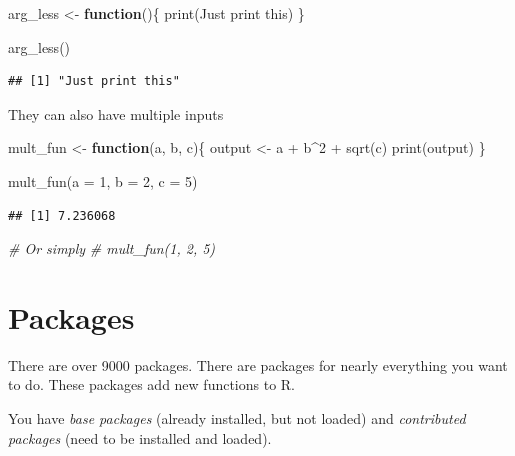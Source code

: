 \documentclass[
]{book}
\newenvironment{Shaded}{\begin{snugshade}}{\end{snugshade}}
\newcommand{\AttributeTok}[1]{\textcolor[rgb]{0.77,0.63,0.00}{#1}}
\newcommand{\CommentTok}[1]{\textcolor[rgb]{0.56,0.35,0.01}{\textit{#1}}}
\newcommand{\ControlFlowTok}[1]{\textcolor[rgb]{0.13,0.29,0.53}{\textbf{#1}}}
\newcommand{\DecValTok}[1]{\textcolor[rgb]{0.00,0.00,0.81}{#1}}
\newcommand{\FunctionTok}[1]{\textcolor[rgb]{0.00,0.00,0.00}{#1}}
\newcommand{\NormalTok}[1]{#1}
\newcommand{\OtherTok}[1]{\textcolor[rgb]{0.56,0.35,0.01}{#1}}
\newcommand{\SpecialCharTok}[1]{\textcolor[rgb]{0.00,0.00,0.00}{#1}}
\newcommand{\StringTok}[1]{\textcolor[rgb]{0.31,0.60,0.02}{#1}}
\begin{document}
\begin{Shaded}
\begin{Highlighting}[]
\NormalTok{arg\_less }\OtherTok{\textless{}{-}} \ControlFlowTok{function}\NormalTok{()\{}
  \FunctionTok{print}\NormalTok{(}\StringTok{\textquotesingle{}Just print this\textquotesingle{}}\NormalTok{)}
\NormalTok{\}}

\FunctionTok{arg\_less}\NormalTok{()}
\end{Highlighting}
\end{Shaded}

\begin{verbatim}
## [1] "Just print this"
\end{verbatim}

They can also have multiple inputs

\begin{Shaded}
\begin{Highlighting}[]
\NormalTok{mult\_fun }\OtherTok{\textless{}{-}} \ControlFlowTok{function}\NormalTok{(a, b, c)\{}
\NormalTok{  output }\OtherTok{\textless{}{-}}\NormalTok{ a }\SpecialCharTok{+}\NormalTok{ b}\SpecialCharTok{\^{}}\DecValTok{2} \SpecialCharTok{+} \FunctionTok{sqrt}\NormalTok{(c)}
  \FunctionTok{print}\NormalTok{(output)}
\NormalTok{\}}

\FunctionTok{mult\_fun}\NormalTok{(}\AttributeTok{a =} \DecValTok{1}\NormalTok{, }\AttributeTok{b =} \DecValTok{2}\NormalTok{, }\AttributeTok{c =} \DecValTok{5}\NormalTok{)}
\end{Highlighting}
\end{Shaded}

\begin{verbatim}
## [1] 7.236068
\end{verbatim}

\begin{Shaded}
\begin{Highlighting}[]
\CommentTok{\# Or simply}
\CommentTok{\# mult\_fun(1, 2, 5)}
\end{Highlighting}
\end{Shaded}

\hypertarget{packages}{%
\section{Packages}\label{packages}}

There are over 9000 packages.
There are packages for nearly everything you want to do.
These packages add new functions to R.

You have \emph{base packages} (already installed, but not loaded) and \emph{contributed packages} (need to be installed and loaded).
\end{document}
